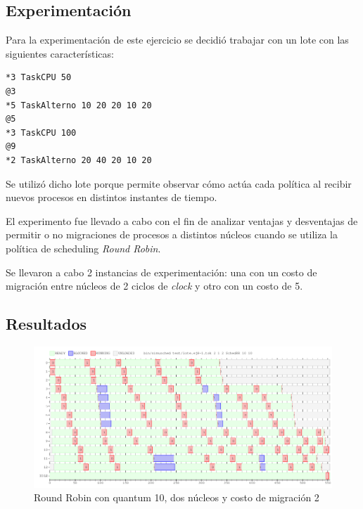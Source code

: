 \documentclass[a4paper]{article}
\begin{document}
\subsection{Experimentación}
Para la experimentación de este ejercicio se decidió trabajar con un lote
con las siguientes características:

\begin{verbatim}
*3 TaskCPU 50
@3
*5 TaskAlterno 10 20 20 10 20
@5
*3 TaskCPU 100
@9
*2 TaskAlterno 20 40 20 10 20
\end{verbatim}

Se utilizó dicho lote porque permite observar cómo actúa cada política al
recibir nuevos procesos en distintos instantes de tiempo.

El experimento fue llevado a cabo con el fin de analizar ventajas y
desventajas de permitir o no migraciones de procesos a distintos núcleos
cuando se utiliza la política de scheduling \textit{Round Robin}.

Se llevaron a cabo 2 instancias de experimentación: una con un costo de
migración entre núcleos de 2 ciclos de \textit{clock} y otro con un costo de
5.

\subsection{Resultados}

\begin{figure}[H]
\begin{center}
\includegraphics[scale=0.4]{imagenes/ej8-1-rr-c-2.png}
\end{center}
\caption{Round Robin con quantum 10, dos núcleos y costo de migración 2}
\end{figure}
\end{document}
